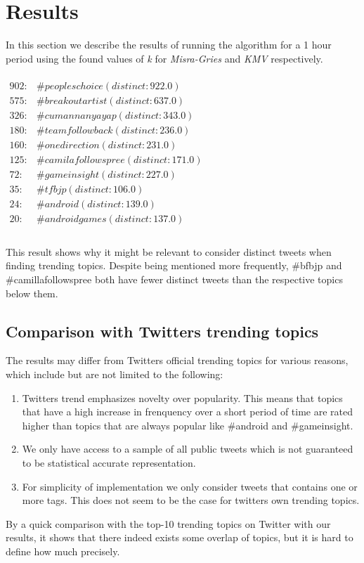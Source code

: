 \section{Results}\label{results}
In this section we describe the results of running the algorithm for a 1 hour period using the found values of \textit{k} for \textit{Misra-Gries} and \textit{KMV} respectively.
\\\\
$\begin{array}{ll}
    902: & \#peopleschoice (distinct: 922.0) \\
    575: & \#breakoutartist (distinct: 637.0) \\
    326: & \#cumannanyayap (distinct: 343.0) \\
    180: & \#teamfollowback (distinct: 236.0) \\
    160: & \#onedirection (distinct: 231.0) \\
    125: & \#camilafollowspree (distinct: 171.0) \\
    72: & \#gameinsight (distinct: 227.0) \\
    35: & \#tfbjp (distinct: 106.0) \\
    24: & \#android (distinct: 139.0) \\
    20: & \#androidgames (distinct: 137.0) \\
\end{array}$
\\\\
This result shows why it might be relevant to consider distinct tweets when finding trending topics. Despite being mentioned more frequently, \#bfbjp and \#camillafollowspree both have fewer distinct tweets than the respective topics below them.

\subsection{Comparison with Twitters trending topics}\label{twitter-result}
The results may differ from Twitters official trending topics for various reasons, which include but are not limited to the following: 

\begin{enumerate}
	\item Twitters trend emphasizes novelty over popularity. This means that topics that have a high increase in frenquency over a short period of time are rated higher than topics that are always popular like \#android and \#gameinsight. 
	\item We only have access to a sample of all public tweets which is not guaranteed to be statistical accurate representation.
    \item For simplicity of implementation we only consider tweets that contains one or more tags. This does not seem to be the case for twitters own trending topics.
\end{enumerate}

By a quick comparison with the top-10 trending topics on Twitter with our results, it shows that there indeed exists some overlap of topics, but it is hard to define how much precisely.


